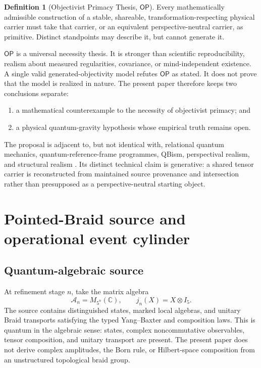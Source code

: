 \documentclass[11pt]{article}
\theoremstyle{definition}
\newtheorem{definition}[theorem]{Definition}
\theoremstyle{remark}
\newcommand{\cA}{\mathcal{A}}
\newcommand{\OPT}{\mathsf{OP}}
\begin{document}
\begin{definition}[Objectivist Primacy Thesis, $\OPT$]
Every mathematically admissible construction of a stable, shareable, transformation-respecting physical carrier must take that carrier, or an equivalent perspective-neutral carrier, as primitive. Distinct standpoints may describe it, but cannot generate it.
\end{definition}

$\OPT$ is a universal necessity thesis. It is stronger than scientific reproducibility, realism about measured regularities, covariance, or mind-independent existence. A single valid generated-objectivity model refutes $\OPT$ as stated. It does not prove that the model is realized in nature. The present paper therefore keeps two conclusions separate:
\begin{enumerate}
\item a mathematical counterexample to the necessity of objectivist primacy; and
\item a physical quantum-gravity hypothesis whose empirical truth remains open.
\end{enumerate}

The proposal is adjacent to, but not identical with, relational quantum mechanics, quantum-reference-frame programmes, QBism, perspectival realism, and structural realism \cite{rovelli1996,giacomini2019,vanrietvelde2020,fuchs2013,massimi2022,ladyman1998,weyl1952}. Its distinct technical claim is generative: a shared tensor carrier is reconstructed from maintained source provenance and intersection rather than presupposed as a perspective-neutral starting object.

\section{Pointed-Braid source and operational event cylinder}

\subsection{Quantum-algebraic source}

At refinement stage $n$, take the matrix algebra
\begin{equation}
 \cA_n=M_{5^n}(\mathbb C),\qquad
 j_n(X)=X\otimes I_5.
\end{equation}
The source contains distinguished states, marked local algebras, and unitary Braid transports satisfying the typed Yang--Baxter and composition laws. This is quantum in the algebraic sense: states, complex noncommutative observables, tensor composition, and unitary transport are present. The present paper does not derive complex amplitudes, the Born rule, or Hilbert-space composition from an unstructured topological braid group.
\end{document}
